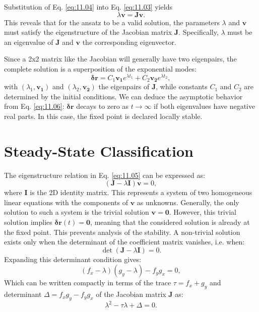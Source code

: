 Substitution of Eq. \eqref{eq:11.04} into Eq. \eqref{eq:11.03} yields
\begin{equation}
    \lambda \mathbf{v} = \mathbf{J} \mathbf{v}. \label{eq:11.05}
\end{equation}
This reveals that for the ansatz to be a valid solution, the parameters $\lambda$ and $\mathbf{v}$ must satisfy the eigenstructure of the Jacobian matrix $\mathbf{J}$. Specifically, $\lambda$ must be an eigenvalue of $\mathbf{J}$ and $\mathbf{v}$ the corresponding eigenvector.

Since a 2x2 matrix like the Jacobian will generally have two eigenpairs, the complete solution is a superposition of the exponential modes:
\begin{equation}
    \mathbf{\delta r} = C_1 \mathbf{v_1} e^{\lambda t_1} + C_2 \mathbf{v_2} e^{\lambda t_2}, \label{eq:11.06}
\end{equation}
with $(\lambda_1, \mathbf{v_1})$ and $(\lambda_2, \mathbf{v_2})$ the eigenpairs of $\mathbf{J}$, while constants $C_1$ and $C_2$ are determined by the initial conditions. We can deduce the asymptotic behavior from Eq. \eqref{eq:11.06}: $\mathbf{\delta r}$ decays to zero as $t\to\infty$ if both eigenvalues have negative real parts. In this case, the fixed point is declared locally stable.

\section{Steady-State Classification}

The eigenstructure relation in Eq. \eqref{eq:11.05} can be expressed as:
\begin{equation*}
    (\mathbf{J} - \lambda \mathbf{I}) \mathbf{v} = 0,
\end{equation*}
where $\mathbf{I}$ is the 2D identity matrix. This represents a system of two homogeneous linear equations with the components of $\mathbf{v}$ as unknowns. Generally, the only solution to such a system is the trivial solution $\mathbf{v} = \mathbf{0}$. However, this trivial solution implies $\mathbf{\delta r}(t) = \mathbf{0}$, meaning that the considered solution is already at the fixed point. This prevents analysis of the stability. A non-trivial solution exists only when the determinant of the coefficient matrix vanishes, i.e. when:
\begin{equation*}
    \det(\mathbf{J} - \lambda \mathbf{I}) = 0.
\end{equation*}
Expanding this determinant condition gives:
\begin{equation*}
    (f_x - \lambda)(g_y - \lambda) - f_y g_x = 0,
\end{equation*}
Which can be written compactly in terms of the trace $\tau=f_x+g_y$ and determinant $\Delta=f_x g_y - f_y g_x$ of the Jacobian matrix $\mathbf{J}$ as:
\begin{equation}
    \lambda^2 - \tau \lambda + \Delta = 0. \label{eq:11.07}
\end{equation}

